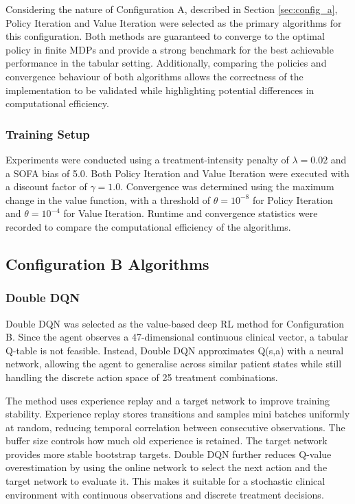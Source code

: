 \documentclass[11pt,a4paper]{article}
\begin{document}
Considering the nature of Configuration A, described in Section \ref{sec:config_a}, 
Policy Iteration and Value Iteration were selected as the primary algorithms for this configuration. 
Both methods are guaranteed to converge to the optimal policy in finite MDPs and provide a strong benchmark for the best achievable performance in the tabular setting.
Additionally, comparing the policies and convergence behaviour of both algorithms allows the correctness of the implementation
to be validated while highlighting potential differences in computational efficiency.

\subsubsection{Training Setup}
Experiments were conducted using a treatment-intensity penalty of $\lambda = 0.02$ and a SOFA bias of 5.0. 
Both Policy Iteration and Value Iteration were executed with a discount factor of $\gamma = 1.0$. 
Convergence was determined using the maximum change in the value function, with a threshold of $\theta = 10^{-8}$ for Policy Iteration 
and $\theta = 10^{-4}$ for Value Iteration. 
Runtime and convergence statistics were recorded to compare the computational efficiency of the algorithms.

\subsection{Configuration B Algorithms}
\subsubsection{Double DQN}

Double DQN was selected as the value-based deep RL method for Configuration B. 
Since the agent observes a 47-dimensional continuous clinical vector, a tabular Q-table is not feasible. 
Instead, Double DQN approximates Q(s,a) with a neural network, 
allowing the agent to generalise across similar patient states while still handling the discrete action space of 25 treatment combinations.

The method uses experience replay and a target network to improve training stability. 
Experience replay stores transitions and samples mini batches uniformly at random, reducing temporal correlation between consecutive observations. 
The buffer size controls how much old experience is retained. The target network provides more stable bootstrap targets. 
Double DQN further reduces Q-value overestimation by using the online network to select the next action and the target network to evaluate it. 
This makes it suitable for a stochastic clinical environment with continuous observations and discrete treatment decisions.
\end{document}
